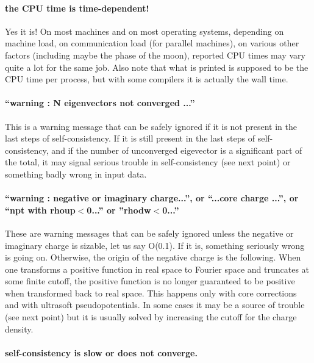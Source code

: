 \documentclass[12pt,a4paper]{article}
\begin{document}
\paragraph{the CPU time is time-dependent!}

Yes it is!
On most machines and on most operating systems, depending on machine
load, on communication load (for parallel machines), on various other
factors (including maybe the phase of the moon), reported CPU times
may vary quite a lot for the same job.
Also note that what is printed is supposed to be the CPU time per
process, but with some compilers it is actually the wall time.

\paragraph{``warning : N eigenvectors not converged ...''}

This is a warning message that can be safely ignored if it
is not present in the last steps of self-consistency. If it 
is still present in the last steps of self-consistency, and
if the number of unconverged eigevector is a significant 
part of the total, it may signal serious trouble in self-consistency
(see next point) or something badly wrong in input data.

\paragraph{``warning : negative or imaginary charge...'', or
``...core charge ...'', or ``npt with rhoup$<$0...'' or ''rhodw$<$0...'' }

These are warning messages that can be safely ignored unless the 
negative or imaginary charge is sizable,
let us say {\cal O(0.1)}. If it is, something seriously 
wrong is going on. Otherwise, the origin of the negative
charge is the following. When one transforms a positive 
function in real space to Fourier space and truncates at 
some finite cutoff, the positive function is no longer 
guaranteed to be positive when transformed back to real 
space. This happens only with core corrections and with 
ultrasoft pseudopotentials. In some cases it may be a 
source of trouble (see next point) but it is usually 
solved by increasing the cutoff for the charge density.

\paragraph{self-consistency is slow or does not converge.}
\end{document}
